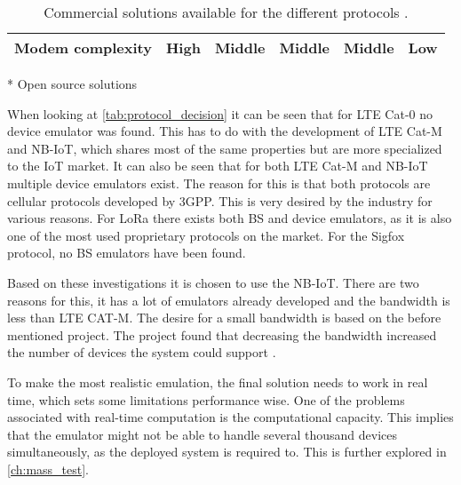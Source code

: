 \begin{table}[H]
{\begin{tabular}{|c|c|c|c|c|c|}
Modem complexity    & High                 & Middle                 & Middle             & Middle         & Low                \\ \hline
\end{tabular}}
\raggedright \scriptsize{ * Open source solutions} 
\caption{Commercial solutions available for the different protocols \citep{UE_list, Amarisoft_solutions, SRS_solutions, LORA_solutions, Things_solutions, Mira_solutions, Telit_solutions, telefonicaid_solutions, murata_solutions}.}%
\label{tab:protocol_decision}
\end{table}


When looking at \autoref{tab:protocol_decision} it can be seen that for \gls{LTE} Cat-0 no device emulator was found. This has to do with the development of \gls{LTE} Cat-M and \gls{NB-IoT}, which shares most of the same properties but are more specialized to the \gls{IoT} market. It can also be seen that for both \gls{LTE} Cat-M and \gls{NB-IoT} multiple device emulators exist. The reason for this is that both protocols are cellular protocols developed by \gls{3GPP}. This is very desired by the industry for various reasons. For \gls{LoRa} there exists both \gls{BS} and device emulators, as it is also one of the most used proprietary protocols on the market. For the Sigfox protocol, no \gls{BS} emulators have been found. 

Based on these investigations it is chosen to use the \gls{NB-IoT}. There are two reasons for this, it has a lot of emulators already developed and the bandwidth is less than LTE CAT-M. The desire for a small bandwidth is based on the before mentioned project. The project found that decreasing the bandwidth increased the number of devices the system could support \citep{thesis_report}. 


To make the most realistic emulation, the final solution needs to work in real time, which sets some limitations performance wise. One of the problems associated with real-time computation is the computational capacity. This implies that the emulator might not be able to handle several thousand devices simultaneously, as the deployed system is required to. This is further explored in \autoref{ch:mass_test}.

